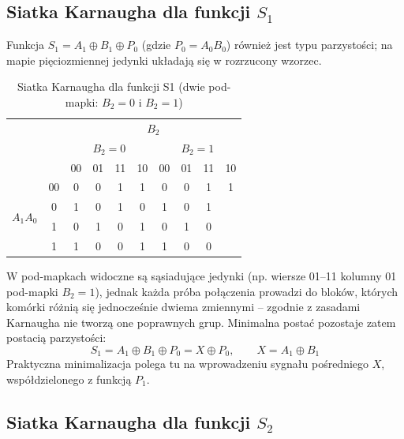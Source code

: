 \documentclass[11pt]{article}
\begin{document}
\subsection{Siatka Karnaugha dla funkcji \(S_1\)}

Funkcja \(S_1 = A_1 \oplus B_1 \oplus P_0\) (gdzie \(P_0 = A_0 B_0\)) również jest typu parzystości; na mapie pięciozmiennej jedynki układają się w rozrzucony wzorzec.
\begin{table}[H]
\centering
\caption{Siatka Karnaugha dla funkcji S1 (dwie pod-mapki: $B_2=0$ i $B_2=1$)}
\label{tab:kmap_S1}
\setlength{\tabcolsep}{5.5pt}
\begin{tabular}{cc|c|c|c|c|c|c|c|c}
\multicolumn{2}{c}{} & \multicolumn{8}{c}{$B_2$} \\
\multicolumn{2}{c}{} & \multicolumn{4}{c}{$B_2=0$} & \multicolumn{4}{c}{$B_2=1$} \\
\multicolumn{2}{c}{} & 00 & 01 & 11 & 10 & 00 & 01 & 11 & 10 \\
\hline
\multirow{4}{*}{$A_1A_0$} & 00 & 0 & 0 & 1 & 1 & 0 & 0 & 1 & 1 \\
01 & 0 & 1 & 0 & 1 & 0 & 1 & 0 & 1 \\
11 & 1 & 0 & 1 & 0 & 1 & 0 & 1 & 0 \\
10 & 1 & 1 & 0 & 0 & 1 & 1 & 0 & 0 \\
\hline
\end{tabular}
\end{table}

W pod-mapkach widoczne są sąsiadujące jedynki (np. wiersze 01--11 kolumny 01 pod-mapki \(B_2=1\)), jednak każda próba połączenia prowadzi do bloków, których komórki różnią się jednocześnie dwiema zmiennymi -- zgodnie z zasadami Karnaugha nie tworzą one poprawnych grup. Minimalna postać pozostaje zatem postacią parzystości:
\begin{equation}
S_1 = A_1 \oplus B_1 \oplus P_0 = X \oplus P_0, \qquad X = A_1 \oplus B_1
\end{equation}
Praktyczna minimalizacja polega tu na wprowadzeniu sygnału pośredniego \(X\), współdzielonego z funkcją \(P_1\).
\subsection{Siatka Karnaugha dla funkcji \(S_2\)}
\end{document}
